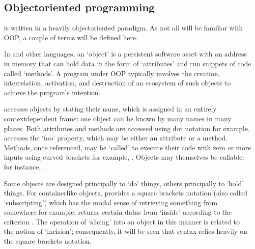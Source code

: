 \documentclass[letterpaper,10pt,english]{jupyterBook}
\begin{document}
\subsection{Object\sphinxhyphen{}oriented programming}
\label{\detokenize{content/chapter_03_everest/implementation:object-oriented-programming}}
\sphinxAtStartPar
{} is written in a heavily object\sphinxhyphen{}oriented paradigm. As not all will be familiar with OOP, a couple of terms will be defined here.

\sphinxAtStartPar
In  and other languages, an ‘object’ is a persistent software asset with an address in memory that can hold data in the form of ‘attributes’ and run snippets of code called ‘methods’. A program under OOP typically involves the creation, interrelation, activation, and destruction of an ecosystem of such objects to achieve the program’s intention.

\sphinxAtStartPar
{} accesses objects by stating their name, which is assigned in an entirely context\sphinxhyphen{}dependent frame: one object can be known by many names in many places. Both attributes and methods are accessed using dot notation \sphinxhyphen{} for example,  accesses the ‘foo’ property, which may be either an attribute or a method. Methods, once referenced, may be ‘called’ to execute their code with zero or more inputs using curved brackets \sphinxhyphen{} for example, . Objects may themselves be callable: for instance, .

\sphinxAtStartPar
Some objects are designed principally to ‘do’ things, others principally to ‘hold’ things. For container\sphinxhyphen{}like objects,  provides a square brackets notation (also called ‘subscripting’) which has the modal sense of retrieving something from somewhere \sphinxhyphen{} for example,  returns certain datas from ‘inside’  according to the criterion . The  operation of ‘slicing’ into an object in this manner is related to the  notion of ‘incision’; consequently, it will be seen that  syntax relies heavily on the square brackets notation.
\end{document}

